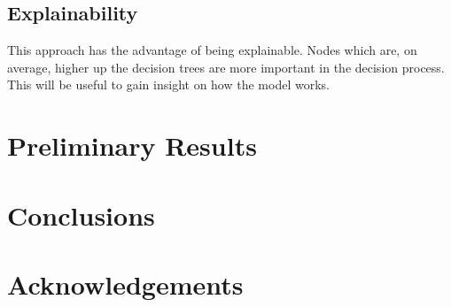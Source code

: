 \documentclass{article}
\begin{document}
\subsection{Explainability}
\label{sub:explainability}
This approach has the advantage of being explainable. Nodes which are, on average, higher up the decision trees are more important in the decision process. This will be useful to gain insight on how the model works.


\section{Preliminary Results}
\label{sec:preliminary_results}




\section{Conclusions}
\label{sec:conclusions}




\section{Acknowledgements}
\label{sec:conclusions}





\end{document}
